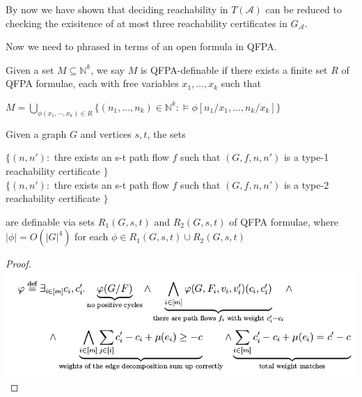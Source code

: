 \documentclass{beamer}
\begin{document}
\begin{frame}

By now we have shown that deciding reachability in $T(\mathcal{A})$ can be reduced to checking the exisitence of at most three reachability certificates in $G_\mathcal{A}$.

Now we need to phrased in terms of an open formula in QFPA.

\begin{definition}
Given a set $M\subseteq \mathbb{N}^k$, we say $M$ is QFPA-definable if there exists a finite set $R$ of QFPA formulae, each with free variables $x_1, \ldots, x_k$ such that 
\begin{center}
$M = \bigcup_{\phi(x_1, \cdots, x_k)\in R}\{(n_1, \ldots, n_k)\in\mathbb{N}^k : \models \phi[n_1/x_1, \ldots, n_k/x_k]\}$
\end{center}
\end{definition}
\end{frame}

\begin{frame}

\begin{lemma}[4.1.15]
Given a graph $G$ and vertices $s,t$, the sets

\begin{center}
$\{(n,n'): $ thre exists an s-t path flow $f$ such that $(G,f,n,n')$ is a type-1 reachability certificate $\}$\\
$\{(n,n'): $ thre exists an s-t path flow $f$ such that $(G,f,n,n')$ is a type-2 reachability certificate $\}$
\end{center}

are definable via sets $R_1(G,s,t)$ and $R_2(G,s,t)$ of QFPA formulae, where $|\phi| = O(|G|^4)$ for each $\phi \in R_1(G,s,t)\cup R_2(G,s,t)$
\end{lemma}

\begin{proof}
\includegraphics[scale=0.4]{1.png}
\end{proof}
\end{frame}

\begin{frame}
\begin{lemma}[4.1.16]

\end{lemma}
\end{frame}
\end{document}
